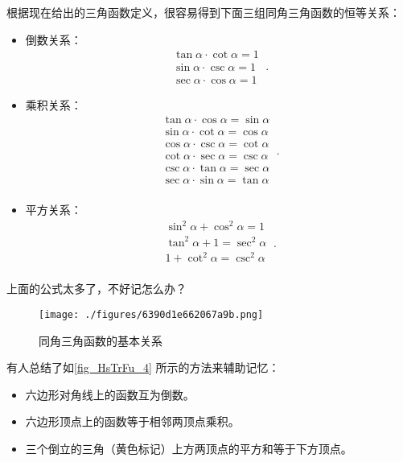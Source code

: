 根据现在给出的三角函数定义，很容易得到下面三组同角三角函数的恒等关系：
\begin{itemize}
\item 倒数关系：
\begin{equation}\label{eq_HsTrFu_1}
\begin{split}
\tan \alpha \cdot \cot \alpha = 1\\
\sin \alpha \cdot  \csc \alpha = 1\\
\sec \alpha  \cdot \cos \alpha = 1
\end{split}~.
\end{equation}
\item 乘积关系：
\begin{equation}\label{eq_HsTrFu_2}
\begin{split}
\tan \alpha \cdot\cos \alpha= \sin \alpha\\
\sin \alpha \cdot\cot \alpha= \cos \alpha\\
\cos \alpha \cdot\csc \alpha= \cot \alpha\\
\cot \alpha \cdot\sec \alpha= \csc \alpha\\
\csc \alpha \cdot\tan \alpha= \sec \alpha\\
\sec \alpha \cdot\sin \alpha= \tan \alpha\\
\end{split}~.
\end{equation}
\item 平方关系：
\begin{equation}\label{eq_HsTrFu_3}
\begin{split}
\sin ^{2} \alpha + \cos ^{2}\alpha =1\\
\tan  ^{2} \alpha + 1 =\sec ^{2}\alpha\\
1 + \cot ^{2}\alpha =\csc ^{2}\alpha\\
\end{split}~.
\end{equation}
\end{itemize}
上面的公式太多了，不好记怎么办？
\begin{figure}[ht]
\centering
\texttt{[image: ./figures/6390d1e662067a9b.png]}
\caption{同角三角函数的基本关系} \label{fig_HsTrFu_4}
\end{figure}
有人总结了如\autoref{fig_HsTrFu_4} 所示的方法来辅助记忆：
\begin{itemize}
\item 六边形对角线上的函数互为倒数。
\item 六边形顶点上的函数等于相邻两顶点乘积。
\item 三个倒立的三角（黄色标记）上方两顶点的平方和等于下方顶点。
\end{itemize}

